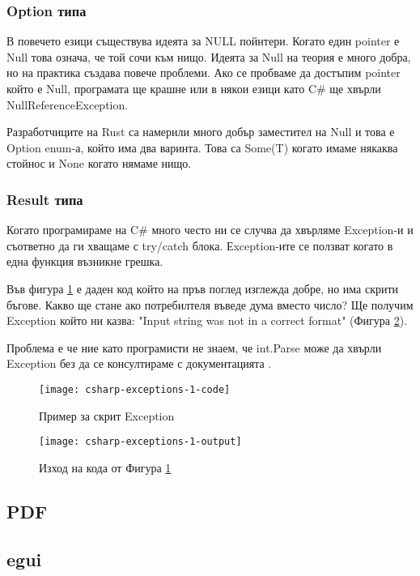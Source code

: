 \subsubsection{Option типа}
В повечето езици съществува идеята за NULL пойнтери. Когато един pointer е Null
това означа, че той сочи към нищо. Идеята за Null на теория е много добра, но
на практика създава повече проблеми. Ако се пробваме да достъпим pointer който
е Null, програмата ще крашне или в някои езици като C\# ще хвърли
NullReferenceException.

Разработчиците на Rust са намерили много добър заместител на Null и това е
Option enum-а, който има два варинта. Това са Some(T) когато имаме някаква
стойнос и None когато нямаме нищо.

\subsubsection{Result типа}
Когато програмираме на C\# много често ни се случва да хвърляме Exception-и и
съответно да ги хващаме с try/catch блока. Еxception-ите се ползват когато в
една функция възникне грешка.

Във фигура \ref{fig:csharp-exceptions-1-code} е даден код който на пръв поглед
изглежда добре, но има скрити бъгове. Какво ще стане ако потребилтеля въведе
дума вместо число? Ще получим Exception който ни казва: "Input string was not
in a correct format" (Фигура \ref{fig:csharp-exceptions-1-output}).

Проблема е че ние като програмисти не знаем, че int.Parse може да хвърли Exception без да се консултираме с документацията \cite{CSharp_Int_Parse}.

\begin{figure}
  \texttt{[image: csharp-exceptions-1-code]}
  \centering
  \caption{Пример за скрит Exception}
  \label{fig:csharp-exceptions-1-code}
\end{figure}

\begin{figure}
  \texttt{[image: csharp-exceptions-1-output]}
  \centering
  \caption{Изход на кода от Фигура \ref{fig:csharp-exceptions-1-code}}
  \label{fig:csharp-exceptions-1-output}
\end{figure}


\subsection{PDF}
\subsection{egui}
